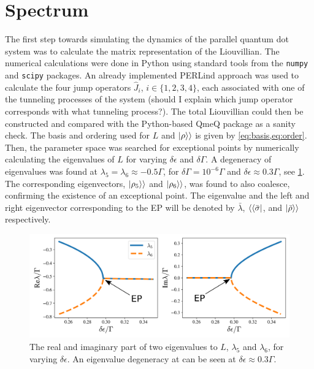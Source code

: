 \documentclass[../main.tex]{subfiles}
\begin{document}
\section{Spectrum}
The first step towards simulating the dynamics of the parallel quantum dot system was to calculate the matrix representation of the Liouvillian. The numerical calculations were done in Python using standard tools from the \verb+numpy+ and \verb+scipy+ packages. An already implemented PERLind approach was used to calculate the four jump operators $\hat J_i$, $i\in\{1,2,3,4\}$, each associated with one of the tunneling processes of the system (should I explain which jump operator corresponds with what tunneling process?). The total Liouvillian could then be constructed and compared with the Python-based QmeQ package \cite{qmeq} as a sanity check. The basis and ordering used for $L$ and $\ket{\rho}\rangle$ is given by \cref{eq:basis,eq:order}. Then, the parameter space was searched for exceptional points by numerically calculating the eigenvalues of $L$ for varying $\delta\epsilon$ and $\delta\Gamma$. A degeneracy of eigenvalues was found at $\lambda_5 = \lambda_6\approx -0.5\Gamma$, for $\delta\Gamma = 10^{-6}\Gamma$ and $\delta\epsilon \approx 0.3\Gamma$, see \cref{fig:tuning}. The corresponding eigenvectors, $\ket{\rho_5}\rangle$ and $\ket{\rho_6}\rangle$, was found to also coalesce, confirming the existence of an exceptional point. The eigenvalue and the left and right eigenvector corresponding to the EP will be denoted by $\bar \lambda$, $\langle\bra{\bar\sigma}$, and $\ket{\bar\rho}\rangle$ respectively.
\begin{figure}[H]
    \centering
    \includegraphics[width=0.9\linewidth]{figures/tuning.png}
    \caption{The real and imaginary part of two eigenvalues to $L$, $\lambda_5$ and $\lambda_6$, for varying $\delta\epsilon$. An eigenvalue degeneracy at can be seen at $\delta\epsilon\approx0.3\Gamma$.}
    \label{fig:tuning}
\end{figure}
\end{document}
